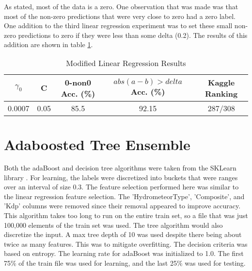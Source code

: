\documentclass[pdftex,a4paper,11pt]{article}
\begin{document}
As stated, most of the data is a zero. One observation that was made was that most of the non-zero predictions that were very close to zero had a zero label. One addition to the third linear regression experiment was to set these small non-zero predictions to zero if they were less than some delta (0.2). The results of this addition are shown in table \ref{table:linAccModified}.
  \begin{table}[h]
        {\centering
          \begin{tabular}{|c|c|c|c|c|}
            \hline
             $\gamma_0$ & C & 0-non0 Acc. (\%) & $abs(a - b) > delta$ Acc. (\%) & Kaggle Ranking\\
            \hline
                0.0007 &   0.05        & 85.5 & 92.15 & 287/308 \\
            \hline
          \end{tabular}
          \caption{Modified Linear Regression Results}          
          \label{table:linAccModified}}
  \end{table}


\section{Adaboosted Tree Ensemble}
Both the adaBoost and decision tree algorithms were taken from the SKLearn library \cite{scikit-learn}. For learning, the labels were discretized into buckets that were ranges over an interval of size 0.3. The feature selection performed here was similar to the linear regression feature selection. The 'HydrometeorType', 'Composite', and 'Kdp' columns were removed since their removal appeared to improve accuracy. This algorithm takes too long to run on the entire train set, so a file that was just 100,000 elements of the train set was used. The tree algorithm would also discretize the input. A max tree depth of 10 was used despite there being about twice as many features. This was to mitigate overfitting. The decision criteria was based on entropy. The learning rate for adaBoost was initialized to 1.0. The first 75\% of the train file was used for learning, and the last 25\% was used for testing.
\end{document}

